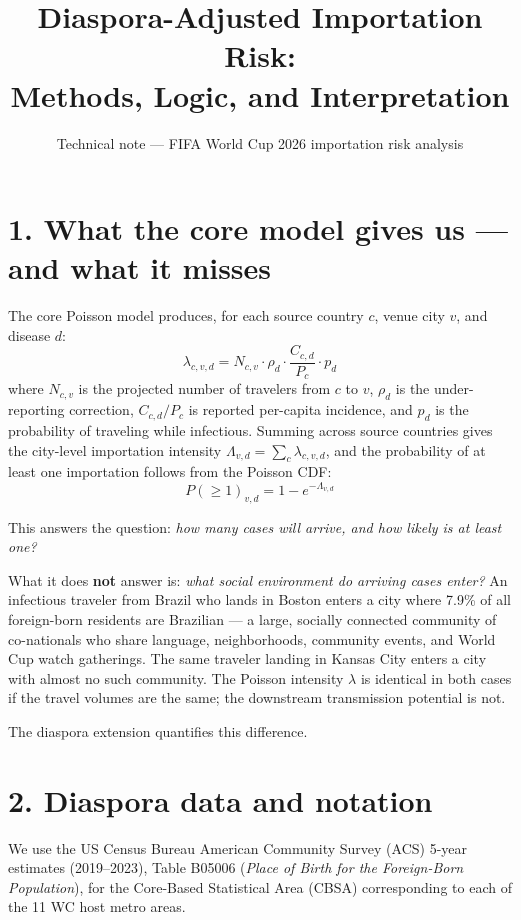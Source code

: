 \documentclass[11pt]{article}
\title{\textbf{Diaspora-Adjusted Importation Risk:\\
       Methods, Logic, and Interpretation}}
\author{Technical note --- FIFA World Cup 2026 importation risk analysis}
\date{}
\begin{document}
\maketitle
\thispagestyle{empty}

\section*{1. What the core model gives us — and what it misses}

The core Poisson model produces, for each source country $c$, venue city $v$,
and disease $d$:
\[
  \lambda_{c,v,d} = N_{c,v} \cdot \rho_d \cdot \frac{C_{c,d}}{P_c} \cdot p_d
\]
where $N_{c,v}$ is the projected number of travelers from $c$ to $v$,
$\rho_d$ is the under-reporting correction, $C_{c,d}/P_c$ is reported
per-capita incidence, and $p_d$ is the probability of traveling while
infectious. Summing across source countries gives the city-level
importation intensity $\Lambda_{v,d} = \sum_c \lambda_{c,v,d}$, and
the probability of at least one importation follows from the Poisson CDF:
\[
  P(\geq 1)_{v,d} = 1 - e^{-\Lambda_{v,d}}
\]

This answers the question: \textit{how many cases will arrive, and how
likely is at least one?}

What it does \textbf{not} answer is: \textit{what social environment
do arriving cases enter?} An infectious traveler from Brazil who lands in
Boston enters a city where 7.9\% of all foreign-born residents are
Brazilian --- a large, socially connected community of co-nationals who
share language, neighborhoods, community events, and World Cup watch
gatherings. The same traveler landing in Kansas City enters a city with
almost no such community. The Poisson intensity $\lambda$ is identical
in both cases if the travel volumes are the same; the downstream
transmission potential is not.

The diaspora extension quantifies this difference.

\section*{2. Diaspora data and notation}

We use the US Census Bureau American Community Survey (ACS) 5-year
estimates (2019--2023), Table B05006 (\textit{Place of Birth for the
Foreign-Born Population}), for the Core-Based Statistical Area (CBSA)
corresponding to each of the 11 WC host metro areas.
\end{document}
